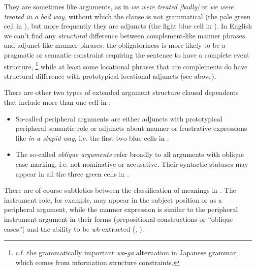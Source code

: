 \documentclass[UTF8, a4paper, oneside, scheme=plain, 12pt]{ctexbook}
\newcommand*{\term}[1]{\emph{#1}}
\newcommand{\form}[1]{\emph{#1}}
\begin{document}
\begin{itemize}
    They are sometimes like arguments, 
    as in \form{we were treated [badly]} or \form{we were treated in a bad way},
    without which the clause is not grammatical
    (the pale green cell in ),
    but more frequently they are adjuncts
    (the light blue cell in ).
    In English we can't find any \emph{structural} difference 
    between complement-like manner phrases and adjunct-like manner phrases: 
    the obligatoriness is more likely to be a pragmatic or semantic constraint 
    requiring the sentence to have a complete event structure,%
    \footnote{
        c.f. the grammatically important \form{wa}-\form{ga} alternation in Japanese grammar, 
        which comes from information structure constraints. 
    }
    while at least some locational phrases that are complements 
    do have structural difference with prototypical locational adjuncts (see above).
\end{itemize}

There are other two types of extended argument structure clausal dependents 
that include more than one cell in :
\begin{itemize}
    \item So-called peripheral arguments
    are either adjuncts with prototypical peripheral semantic role
    or adjuncts about manner or frustrative expressions like \form{in a stupid way},
    i.e. the first two blue cells in .

    \item The so-called \term{oblique arguments}
    refer broadly to all arguments with oblique case marking, i.e. not nominative or accusative.
    Their syntactic statuses may appear in 
    all the three green cells in .
\end{itemize}


There are of course subtleties between the classification of meanings in .
The instrument role, for example, 
may appear in the subject position or as a peripheral argument, 
while the manner expression is similar to the peripheral instrument argument 
in their forms (prepositional constructions or ``oblique cases'')
and the ability to be \form{wh}-extracted
(, ).
\end{document}
